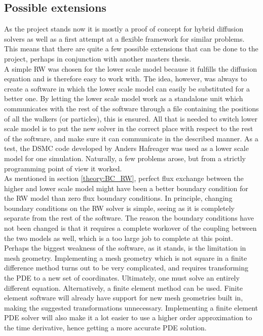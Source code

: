 \subsection{Possible extensions}
As the project stands now it is mostly a proof of concept for hybrid diffusion solvers as well as a first attempt at a flexible framework for similar problems. 
This means that there are quite a few possible extensions that can be done to the project, perhaps in conjunction with another masters thesis. \\

\noindent A simple RW was chosen for the lower scale model because it fulfills the diffusion equation and is therefore easy to work with. 
The idea, however, was always to create a software in which the lower scale model can easily be substituted for a better one. 
By letting the lower scale model work as a standalone unit which communicates with the rest of the software through a file containing the positions of all the walkers (or particles), this is ensured. 
All that is needed to switch lower scale model is to put the new solver in the correct place with respect to the rest of the software, and make sure it can communicate in the described manner. 
As a test, the DSMC code developed by Anders Hafreager was used as a lower scale model for one simulation. 
Naturally, a few problems arose, but from a strictly programming point of view it worked. \\

\noindent As mentioned in section \ref{theory:BC_RW}, perfect flux exchange between the higher and lower scale model might have been a better boundary condition for the RW model than zero flux boundary conditions. 
In principle, changing boundary conditions on the RW solver is simple, seeing as it is completely separate from the rest of the software. 
The reason the boundary conditions have not been changed is that it requires a complete workover of the coupling between the two models as well, which is a too large job to complete at this point. \\

\noindent Perhaps the biggest weakness of the software, as it stands, is the limitation in mesh geometry. 
Implementing a mesh geometry which is not square in a finite difference method turns out to be very complicated, and requires transforming the PDE to a new set of coordinates. 
Ultimately, one must solve an entirely different equation. 
Alternatively, a finite element method can be used. 
Finite element software will already have support for new mesh geometries built in, making the suggested transformations unnecessary. 
Implementing a finite element PDE solver will also make it a lot easier to use a higher order approximation to the time derivative, hence getting a more accurate PDE solution. 

